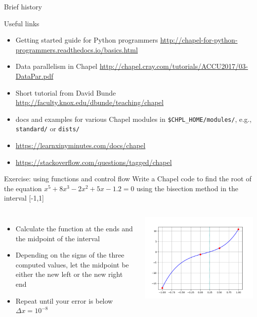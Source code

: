 \begin{frame}{Brief history}
\end{frame}

\begin{frame}{Useful links}
  \begin{itemize}\setlength{\itemsep}{3mm}
    \item Getting started guide for Python programmers
    {\small\url{http://chapel-for-python-programmers.readthedocs.io/basics.html}}
    \item Data parallelism in Chapel \url{http://chapel.cray.com/tutorials/ACCU2017/03-DataPar.pdf}
    \item Short tutorial from David Bunde \url{http://faculty.knox.edu/dbunde/teaching/chapel}
    \item docs and examples for various Chapel modules in \texttt{\$CHPL\_HOME/modules/}, e.g.,
    \texttt{standard/} or \texttt{dists/}
    \item \url{https://learnxinyminutes.com/docs/chapel}
    \item \url{https://stackoverflow.com/questions/tagged/chapel}
  \end{itemize}
\end{frame}

\begin{frame}{Exercise: using functions and control flow}
  Write a Chapel code to find the root of the equation $x^5 + 8x^3 - 2x^2 + 5x - 1.2 = 0$ using the bisection
  method in the interval [-1,1]
  \begin{columns}[]
    \begin{itemize}\setlength{\itemsep}{3mm}
      \item Calculate the function at the ends and the midpoint of the interval
      \item Depending on the signs of the three computed values, let the midpoint be either the new left
      or the new right end
      \item Repeat until your error is below $\Delta x=10^{-8}$
    \end{itemize}
    \includegraphics[width=0.95\columnwidth]{figs/bisection.png}
  \end{columns}
\end{frame}
